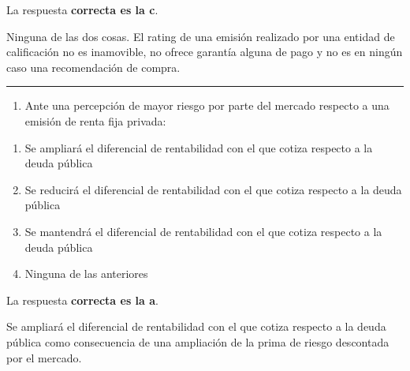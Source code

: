 \documentclass[
  letterpaper,
  DIV=11,
  numbers=noendperiod]{scrreprt}
\providecommand{\tightlist}{%
  \setlength{\itemsep}{0pt}\setlength{\parskip}{0pt}}\usepackage{longtable,booktabs,array}
\begin{document}
\begin{tcolorbox}[enhanced jigsaw, left=2mm, opacityback=0, colback=white, breakable, arc=.35mm, bottomrule=.15mm, rightrule=.15mm, toprule=.15mm, leftrule=.75mm, colframe=quarto-callout-tip-color-frame]
\begin{minipage}[t]{5.5mm}
\textcolor{quarto-callout-tip-color}{\faLightbulb}
\end{minipage}%
\begin{minipage}[t]{\textwidth - 5.5mm}

La respuesta \textbf{correcta es la c}.

Ninguna de las dos cosas. El rating de una emisión realizado por una
entidad de calificación no es inamovible, no ofrece garantía alguna de
pago y no es en ningún caso una recomendación de compra.

\end{minipage}%
\end{tcolorbox}

\begin{center}\rule{0.5\linewidth}{0.5pt}\end{center}

\begin{enumerate}
\def\labelenumi{\arabic{enumi}.}
\setcounter{enumi}{78}
\tightlist
\item
  Ante una percepción de mayor riesgo por parte del mercado respecto a
  una emisión de renta fija privada:
\end{enumerate}

\begin{enumerate}
\def\labelenumi{\alph{enumi})}
\item
  Se ampliará el diferencial de rentabilidad con el que cotiza respecto
  a la deuda pública
\item
  Se reducirá el diferencial de rentabilidad con el que cotiza respecto
  a la deuda pública
\item
  Se mantendrá el diferencial de rentabilidad con el que cotiza respecto
  a la deuda pública
\item
  Ninguna de las anteriores
\end{enumerate}

\begin{tcolorbox}[enhanced jigsaw, left=2mm, opacityback=0, colback=white, breakable, arc=.35mm, bottomrule=.15mm, rightrule=.15mm, toprule=.15mm, leftrule=.75mm, colframe=quarto-callout-tip-color-frame]
\begin{minipage}[t]{5.5mm}
\textcolor{quarto-callout-tip-color}{\faLightbulb}
\end{minipage}%
\begin{minipage}[t]{\textwidth - 5.5mm}

La respuesta \textbf{correcta es la a}.

Se ampliará el diferencial de rentabilidad con el que cotiza respecto a
la deuda pública como consecuencia de una ampliación de la prima de
riesgo descontada por el mercado.

\end{minipage}%
\end{tcolorbox}
\end{document}
